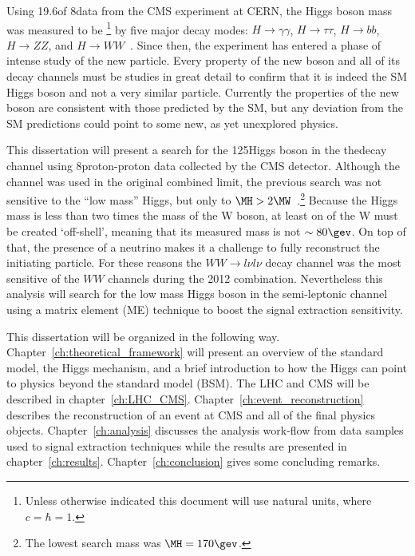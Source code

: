 Using 19.6\fbinv of 8\tev data from the CMS experiment at CERN, the Higgs boson mass was measured to be \footnote{Unless otherwise indicated this document will use natural units, where $c=\hbar=1$.} by five major decay modes: $H\rightarrow\gamma\gamma$, $H\rightarrow\tau\tau$, $H\rightarrow{bb}$, $H\rightarrow{ZZ}$, and $H\rightarrow{WW}$~\cite{CMS-PAS-HIG-13-005}.
Since then, the experiment has entered a phase of intense study of the new particle.
Every property of the new boson and all of its decay channels must be studies in great detail to confirm that it is indeed the SM Higgs boson and not a very similar particle.
Currently the properties of the new boson are consistent with those predicted by the SM, but any deviation from the SM predictions could point to some new, as yet unexplored physics.

This dissertation will present a search for the 125\gev Higgs boson in the the\newline\HWWlnujj decay channel using 8\tev proton-proton data collected by the CMS detector.
Although the \HWWlnujj channel was used in the original combined limit, the previous search was not sensitive to the ``low mass'' Higgs, but only to 
$\MH>2\MW$~\cite{CMS-PAS-HIG-13-027}.\footnote{The lowest search mass was $\MH=170\gev$.}
Because the Higgs mass is less than two times the mass of the W boson, at least on of the W must be created `off-shell', meaning that its measured mass is not $\sim80\gev$.
On top of that, the presence of a neutrino makes it a challenge to fully reconstruct the initiating particle.
For these reasons the $WW\rightarrow{l\nu}{l\nu}$ decay channel was the most sensitive of the $WW$ channels during the 2012 combination.
Nevertheless this analysis will search for the low mass Higgs boson in the semi-leptonic channel using a matrix element (ME) technique to boost the signal extraction sensitivity.

This dissertation will be organized in the following way.
Chapter~\ref{ch:theoretical_framework} will present an overview of the standard model, the Higgs mechanism, and a brief introduction to how the Higgs can point to physics beyond the standard model (BSM).
The LHC and CMS will be described in chapter~\ref{ch:LHC_CMS}.
Chapter~\ref{ch:event_reconstruction} describes the reconstruction of an event at CMS and all of the final physics objects.
Chapter~\ref{ch:analysis} discusses the analysis work-flow from data samples used to signal extraction techniques while the results are presented in chapter~\ref{ch:results}.
Chapter~\ref{ch:conclusion} gives some concluding remarks.

